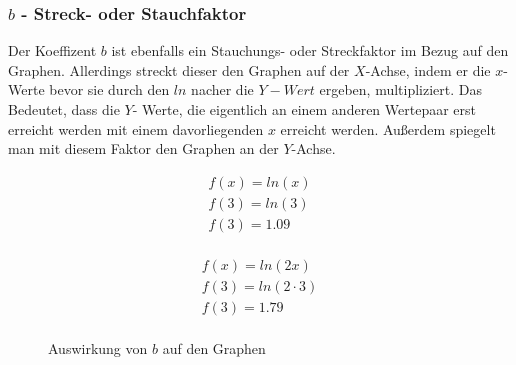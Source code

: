 \subsubsection{$b$ - Streck- oder Stauchfaktor}
Der Koeffizent $b$ ist ebenfalls ein Stauchungs- oder Streckfaktor im Bezug auf den Graphen. Allerdings streckt dieser den Graphen auf der $X$-Achse, indem er die $x$-Werte bevor sie durch den $ln$ nacher die $Y-Wert$ ergeben, multipliziert. Das Bedeutet, dass die $Y$- Werte, die eigentlich an einem anderen Wertepaar erst erreicht werden mit einem davorliegenden $x$ erreicht werden. Außerdem spiegelt man mit diesem Faktor den Graphen an der $Y$-Achse.  
\begin{paracol}{2}
	\begin{flushleft}
	\begin{beispiel}
	\begin{align*}
		f(x)=ln(x)\\
		f(3)=ln(3)\\
		f(3)=1.09\\
	\end{align*}
\end{beispiel}
	\end{flushleft}	
\switchcolumn
	\begin{flushright}
		\begin{beispiel}
	\begin{align*}
		f(x)=ln(2x)\\
		f(3)=ln(2\cdot3)\\
		f(3)=1.79\\
	\end{align*}
\end{beispiel}
	\end{flushright}
\end{paracol}
\begin{figure}[h]
\centering
	\caption{Auswirkung von $b$ auf den Graphen}
\end{figure}
\pagebreak
